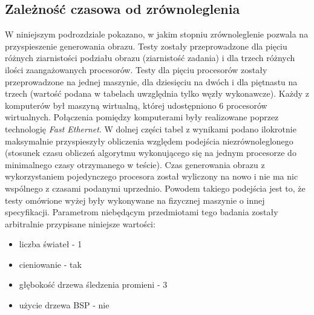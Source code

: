 \subsection{Zależność czasowa od zrównoleglenia}

W niniejszym podrozdziale pokazano, w jakim stopniu zrównoleglenie pozwala na przyspieszenie generowania obrazu. Testy zostały przeprowadzone dla pięciu różnych ziarnistości podziału obrazu (ziarnistość zadania) i dla trzech różnych ilości zaangażowanych procesorów. Testy dla pięciu procesorów zostały przeprowadzone na jednej maszynie, dla dziesięciu na dwóch i dla piętnastu na trzech (wartość podana w tabelach uwzględnia tylko węzły wykonawcze). Każdy z komputerów był maszyną wirtualną, której udostępniono 6 procesorów wirtualnych. Połączenia pomiędzy komputerami były realizowane poprzez technologię \emph{Fast Ethernet}. W dolnej części tabel z wynikami podano ilokrotnie maksymalnie przyspieszyły obliczenia względem podejścia niezrównoleglonego (stosunek czasu obliczeń algorytmu wykonującego się na jednym procesorze do minimalnego czasy otrzymanego w teście). Czas generowania obrazu z wykorzystaniem pojedynczego procesora został wyliczony na nowo i nie ma nic wspólnego z czasami podanymi uprzednio. Powodem takiego podejścia jest to, że testy omówione wyżej były wykonywane na fizycznej maszynie o innej specyfikacji. Parametrom niebędącym przedmiotami tego badania zostały arbitralnie przypisane niniejsze wartości:

\begin{itemize}

\item liczba świateł - 1
\item cieniowanie - tak
\item głębokość drzewa śledzenia promieni - 3
\item użycie drzewa BSP - nie

\end{itemize}

